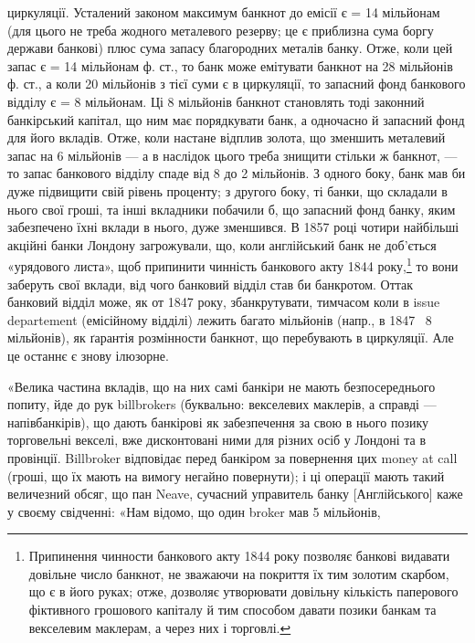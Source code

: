 циркуляції. Усталений законом максимум банкнот до емісії є = 14 мільйонам
(для цього не треба жодного металевого резерву; це є приблизна сума боргу
держави банкові) плюс сума запасу благородних металів банку. Отже, коли цей запас
є = 14 мільйонам ф. ст., то банк може емітувати банкнот на 28 мільйонів ф. ст.,
а коли 20 мільйонів з тієї суми є в циркуляції, то запасний фонд банкового відділу
є = 8 мільйонам. Ці 8 мільйонів банкнот становлять тоді законний банкірський
капітал, що ним має порядкувати банк, а одночасно й запасний фонд для його
вкладів. Отже, коли настане відплив золота, що зменшить металевий запас на
6 мільйонів — а в наслідок цього треба знищити стільки ж банкнот, — то запас
банкового відділу спаде від 8 до 2 мільйонів. З одного боку, банк мав би дуже
підвищити свій рівень проценту; з другого боку, ті банки, що складали в нього
свої гроші, та інші вкладники побачили б, що запасний фонд банку, яким забезпечено
їхні вклади в нього, дуже зменшився. В 1857 році чотири найбільші
акційні банки Лондону загрожували, що, коли англійський банк не доб’ється «урядового листа», щоб
припинити чинність банкового акту 1844 року,\footnote{Припинення чинности банкового акту 1844 року позволяє банкові видавати довільне число банкнот, не
зважаючи на покриття їх тим золотим скарбом, що є в його руках; отже, дозволяє утворювати довільну
кількість паперового фіктивного грошового капіталу й тим способом давати позики банкам та векселевим
маклерам, а через них і торговлі.} то вони
заберуть свої вклади, від чого банковий відділ став би банкротом. Оттак банковий
відділ може, як от 1847 року, збанкрутувати, тимчасом коли в issue departement
(емісійному відділі) лежить багато мільйонів (напр., в 1847~ 8 мільйонів),
як ґарантія розмінности банкнот, що перебувають в циркуляції. Але це
останнє є знову ілюзорне.

«Велика частина вкладів, що на них самі банкіри не мають безпосереднього
попиту, йде до рук billbrokers (буквально: векселевих маклерів, а справді —
напівбанкірів), що дають банкірові як забезпечення за свою в нього позику
торговельні векселі, вже дисконтовані ними для різних осіб у Лондоні та в
провінції. Billbroker відповідає перед банкіром за повернення цих money at
call (гроші, що їх мають на вимогу негайно повернути); і ці операції мають
такий величезний обсяг, що пан Neave, сучасний управитель банку [Англійського]
каже у своєму свідченні: «Нам відомо, що один broker мав 5 мільйонів,

\parbreak{}  %
